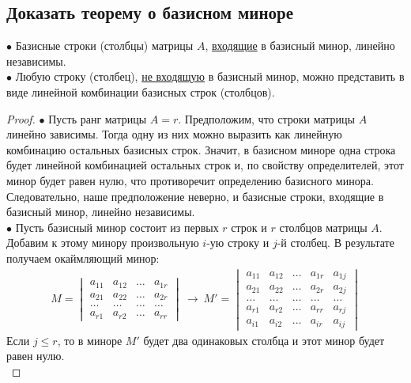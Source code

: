 \subsection{Доказать теорему о базисном миноре}
\begin{theorem*}
	$\bullet$ Базисные строки (столбцы) матрицы $A$, \underline{входящие} в базисный минор, линейно независимы.\\
	$\bullet$ Любую строку (столбец), \underline{не входящую} в базисный минор, можно представить в виде линейной комбинации базисных строк (столбцов).
\end{theorem*}
\begin{proof}
	$\bullet$ Пусть ранг матрицы $A = r$. Предположим, что строки матрицы $A$ линейно зависимы. Тогда одну из них можно выразить как линейную комбинацию остальных базисных строк. Значит, в базисном миноре одна строка будет линейной комбинацией остальных строк и, по свойству определителей, этот минор будет равен нулю, что противоречит определению базисного минора. Следовательно, наше предположение неверно, и базисные строки, входящие в базисный минор, линейно независимы. \\
	$\bullet$ Пусть базисный минор состоит из первых $r$ строк и $r$ столбцов матрицы $A$. Добавим к этому минору произвольную $i$-ую строку и $j$-й столбец. В результате получаем окаймляющий минор:
	\begin{align*}
		M = \begin{vmatrix}
			a_{11} & a_{12} & \ldots & a_{1r} \\
			a_{21} & a_{22} & \ldots & a_{2r} \\
			\ldots & \ldots & \ldots & \ldots \\
			a_{r1} & a_{r2} & \ldots & a_{rr}
		\end{vmatrix}\ \longrightarrow\
		M' = \begin{vmatrix}
			a_{11} & a_{12} & \ldots & a_{1r} & a_{1j} \\
			a_{21} & a_{22} & \ldots & a_{2r} & a_{2j} \\
			\ldots & \ldots & \ldots & \ldots & \ldots \\
			a_{r1} & a_{r2} & \ldots & a_{rr} & a_{rj} \\
			a_{i1} & a_{i2} & \ldots & a_{ir} & a_{ij}
		\end{vmatrix}
	\end{align*} 
	Если $j \le r$, то в миноре $M'$ будет два одинаковых столбца и этот минор будет равен нулю.\\

\end{proof}
